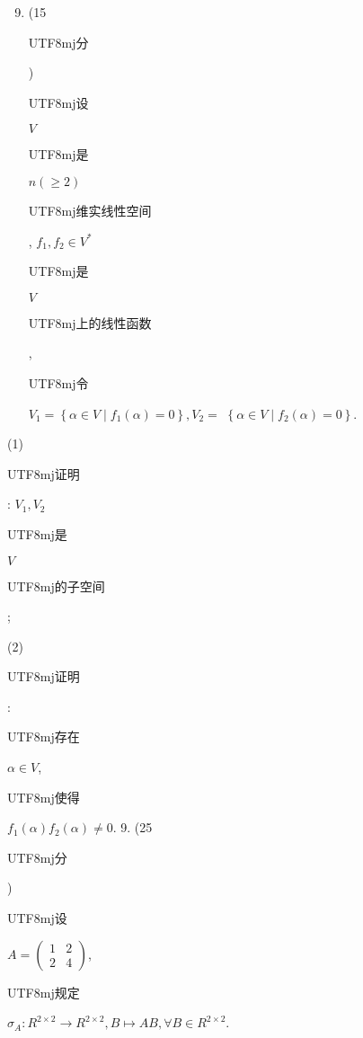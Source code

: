 \documentclass[10pt]{article}
\begin{document}
\begin{enumerate}
  \setcounter{enumi}{8}
  \item (15 \begin{CJK}{UTF8}{mj}分\end{CJK}) \begin{CJK}{UTF8}{mj}设\end{CJK} $V$ \begin{CJK}{UTF8}{mj}是\end{CJK} $n(\geqslant 2)$ \begin{CJK}{UTF8}{mj}维实线性空间\end{CJK}, $f_{1}, f_{2} \in V^{*}$ \begin{CJK}{UTF8}{mj}是\end{CJK} $V$ \begin{CJK}{UTF8}{mj}上的线性函数\end{CJK}, \begin{CJK}{UTF8}{mj}令\end{CJK} $V_{1}=\left\{\alpha \in V \mid f_{1}(\alpha)=0\right\}, V_{2}=$ $\left\{\alpha \in V \mid f_{2}(\alpha)=0\right\} .$
\end{enumerate}
(1) \begin{CJK}{UTF8}{mj}证明\end{CJK}: $V_{1}, V_{2}$ \begin{CJK}{UTF8}{mj}是\end{CJK} $V$ \begin{CJK}{UTF8}{mj}的子空间\end{CJK};

(2) \begin{CJK}{UTF8}{mj}证明\end{CJK}: \begin{CJK}{UTF8}{mj}存在\end{CJK} $\alpha \in V$, \begin{CJK}{UTF8}{mj}使得\end{CJK} $f_{1}(\alpha) f_{2}(\alpha) \neq 0$. 9. (25 \begin{CJK}{UTF8}{mj}分\end{CJK}) \begin{CJK}{UTF8}{mj}设\end{CJK} $A=\left(\begin{array}{ll}1 & 2 \\ 2 & 4\end{array}\right)$, \begin{CJK}{UTF8}{mj}规定\end{CJK} $\sigma_{A}: R^{2 \times 2} \rightarrow R^{2 \times 2}, B \mapsto A B, \forall B \in R^{2 \times 2}$.
\end{document}
